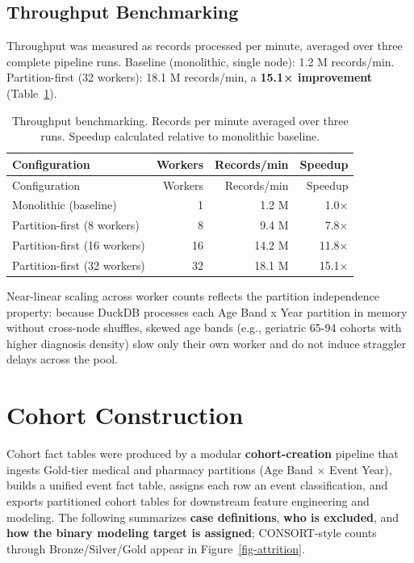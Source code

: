 \documentclass[
  12pt,
]{book}
\begin{document}
\subsection{Throughput Benchmarking}\label{throughput-benchmarking}

Throughput was measured as records processed per minute, averaged over
three complete pipeline runs. Baseline (monolithic, single node): 1.2 M
records/min. Partition-first (32 workers): 18.1 M records/min, a
\textbf{15.1× improvement} (Table~\ref{tbl-throughput}).

\begin{longtable}[]{@{}lrrr@{}}
\caption{Throughput benchmarking. Records per minute averaged over three
runs. Speedup calculated relative to monolithic
baseline.}\label{tbl-throughput}\tabularnewline
\toprule\noalign{}
Configuration & Workers & Records/min & Speedup \\
\midrule\noalign{}
\endfirsthead
\toprule\noalign{}
Configuration & Workers & Records/min & Speedup \\
\midrule\noalign{}
\endhead
\bottomrule\noalign{}
\endlastfoot
Monolithic (baseline) & 1 & 1.2 M & 1.0× \\
Partition-first (8 workers) & 8 & 9.4 M & 7.8× \\
Partition-first (16 workers) & 16 & 14.2 M & 11.8× \\
Partition-first (32 workers) & 32 & 18.1 M & 15.1× \\
\end{longtable}

Near-linear scaling across worker counts reflects the partition
independence property: because DuckDB processes each Age Band x Year
partition in memory without cross-node shuffles, skewed age bands (e.g.,
geriatric 65-94 cohorts with higher diagnosis density) slow only their
own worker and do not induce straggler delays across the pool.

\section{Cohort Construction}\label{sec-cohort}

Cohort fact tables were produced by a modular \textbf{cohort-creation}
pipeline that ingests Gold-tier medical and pharmacy partitions (Age
Band \(\times\) Event Year), builds a unified event fact table, assigns
each row an event classification, and exports partitioned cohort tables
for downstream feature engineering and modeling. The following
summarizes \textbf{case definitions}, \textbf{who is excluded}, and
\textbf{how the binary modeling target is assigned}; CONSORT-style
counts through Bronze/Silver/Gold appear in Figure~\ref{fig-attrition}.
\end{document}
